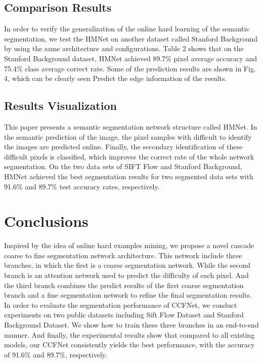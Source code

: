 \documentclass[10.5pt,compsoc]{TsT}
\theoremstyle{mystyle}
\begin{document}
{\subsection{Comparison Results}
\noindent
In order to verify the generalization of the online hard learning of the semantic segmentation, we test the HMNet on another dataset called Stanford Background by using the same architecture and configurations. Table 2 shows that on the Stanford Background dataset, HMNet achieved 89.7\% pixel average accuracy and 75.4\% class average correct rate. Some of the prediction results are shown in Fig. 4, which can be clearly seen Predict the edge information of the results.

\subsection{Results Visualization}
\noindent
This paper presents a semantic segmentation network structure called HMNet. In the semantic prediction of the image, the pixel samples with difficult to identify the images are predicted online. Finally, the secondary identification of these difficult pixels is classified, which improves the correct rate of the whole network segmentation. On the two data sets of SIFT Flow and Stanford Background, HMNet achieved the best segmentation results for two segmented data sets with 91.6\% and 89.7\% test accuracy rates, respectively.


\section{Conclusions}
\noindent

Inspired by the idea of online hard examples mining, we propose a novel cascade coarse to fine segmentation network architecture.
This network include three branches, in which the first is a coarse segmentation network.
While the second branch is an attention network used to predict the difficulty of each pixel.
And the third branch combines the predict results of the first coarse segmentation branch and a fine segmentation network to refine the final segmentation results.
In order to evaluate the segmentation performance of CCFNet, we conduct experiments on two public datasets including Sift Flow Dataset and Stanford Background Dataset. 
We show how to train these three branches in an end-to-end manner. And finally, the experimental results show that compared to all existing models, our CCFNet consistently yields the best performance, with the accuracy of 91.6\% and 89.7\%, respectively.


}
\end{document}
